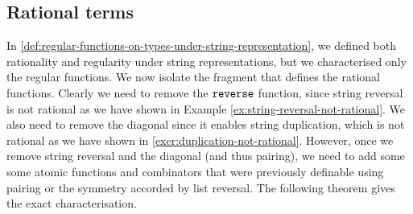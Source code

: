 \subsection{Rational terms}
\label{sec:rational-terms}
In \cref{def:regular-functions-on-types-under-string-representation}, we defined both rationality and regularity under string representations, but we characterised only the regular functions. We now isolate the fragment that defines the rational functions.  Clearly we need to remove the $\mathtt{reverse}$ function, since string reversal is not rational as we have shown in Example \ref{ex:string-reversal-not-rational}. We also need to remove the diagonal since it enables string duplication, which is not rational as we have shown in \cref{exer:duplication-not-rational}. However, once we remove string reversal and  the diagonal (and thus pairing), we need to add some  some  atomic functions and combinators that were previously definable using pairing or the symmetry accorded by list reversal. The following theorem gives the exact characterisation. 



